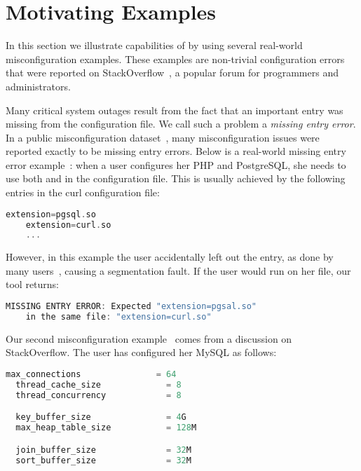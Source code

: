 \section{Motivating Examples}
\label{sec:motiv}

In this section we illustrate capabilities of \app by 
using several real-world misconfiguration examples. 
These examples are non-trivial configuration errors
that were reported on StackOverflow~\cite{stackoverflow},
a popular forum for programmers and administrators. 

Many critical system outages result from the fact that an important
entry was missing from the configuration file. 
We call such a problem a {\em missing entry error}.
In a public misconfiguration 
dataset~\cite{configdataset}, many misconfiguration issues were 
reported exactly to be missing entry errors.
Below is a real-world missing entry error example~\cite{missingentry}:
when a user configures her PHP and PostgreSQL,
she needs to use both  and 
in the  configuration file.
This is usually
achieved by the following entries in 
the curl configuration file:

\begin{lstlisting}[language=C, xleftmargin=.01\textwidth]
    extension=pgsql.so
    extension=curl.so
    ...
\end{lstlisting} 

However, in this example the user accidentally
left out the  entry, 
as done by many users~\cite{yin11anempirical, missingentry}, 
causing a segmentation fault. 
If the user would run \app on her file,
our tool returns:

\begin{lstlisting}[language=C, xleftmargin=.01\textwidth]
    MISSING ENTRY ERROR: Expected "extension=pgsal.so"
    in the same file: "extension=curl.so"
\end{lstlisting} 

\label{ex:fine}
Our second misconfiguration example~\cite{correlation} 
comes from a discussion on StackOverflow.
The user has configured her MySQL as follows:

\begin{lstlisting}[language=C, xleftmargin=.01\textwidth]
  max_connections               = 64
  thread_cache_size             = 8
  thread_concurrency            = 8

  key_buffer_size               = 4G
  max_heap_table_size           = 128M

  join_buffer_size              = 32M
  sort_buffer_size              = 32M    
\end{lstlisting} 

